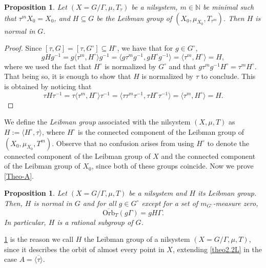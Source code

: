 \documentclass[letter, 11pt]{article}
\newtheorem{proposition}[theorem]{Proposition}
\theoremstyle{definition}
\theoremstyle{plain}
\newcommand{\N}{\mathbb{N}}
\newcommand{\1}{\mathbbm{1}}
\begin{document}
\begin{proposition}\label{H-normal}
         Let $(X=G/\Gamma,\mu,T_\tau)$ be a nilsystem, $m\in \N$ be minimal such that $\tau^mX_0=X_0$, and $H\subseteq G$ be the Leibman group of $(X_0,\mu_{X_0},T_{\tau^m})$. Then $H$ is normal in $G$.
\end{proposition}
\begin{proof}
Since $[\tau,G]=[\tau,G^\circ]\subseteq H^\circ$, we have that for $g\in G^{\circ}$,
$$gHg^{-1}= g\langle \tau^m, H^{\circ}\rangle g^{-1}=\langle g \tau^m g^{-1},gH^{\circ}g^{-1}\rangle =\langle \tau^m , H^{\circ}\rangle= H,$$
where we used the fact that $H^{\circ}$ is normalized by $G^{\circ}$ and that $g\tau^m g^{-1}H^{\circ}=\tau^m H^{\circ}$. That being so, it is enough to show that $H$ is normalized by $\tau$ to conclude. This is obtained by noticing that
   $$\tau H \tau^{-1}= \tau \langle \tau^m, H^{\circ}\rangle \tau^{-1} = \langle \tau \tau^m\tau^{-1} , \tau H^{\circ}\tau^{-1} \rangle =\langle \tau^m, H^{\circ}\rangle = H.$$
   \end{proof}
We define the \textit{Leibman group} associated with the nilsystem $(X,\mu,T)$ as $H:=\langle  H^{\circ},\tau\rangle$, where $H^{\circ}$ is the connected component of the Leibman group of $(X_0,\mu_{X_0},T^m)$. Observe that no confusion arises from using $H^{\circ}$ to denote the connected component of the Leibman group of $X$ and the connected component of the Leibman group of $X_0$, since both of these groups coincide. Now we prove \cref{Theo-A}.
\begin{proposition}\label{first-part-theo-A}
    Let $(X=G/\Gamma,\mu, T)$ be a nilsystem and $H$ its Leibman group. Then, $H$ is normal in $G$ and for all $g\in G^{\circ}$ except for a set of $m_{G^{\circ}}$-measure zero,     $$\overline{\mathrm{Orb}}_T(g\Gamma)=gH\Gamma. $$
    In particular, $H$ is a rational subgroup of $G$.
\end{proposition}
\cref{first-part-theo-A} is the reason we call $H$ the Leibman group of a nilsystem $(X=G/\Gamma,\mu,T)$, since it describes the orbit of almost every point in $X$, extending \cref{theo2.2L} in the case $A=\overline{\langle \tau \rangle}$.
\end{document}
